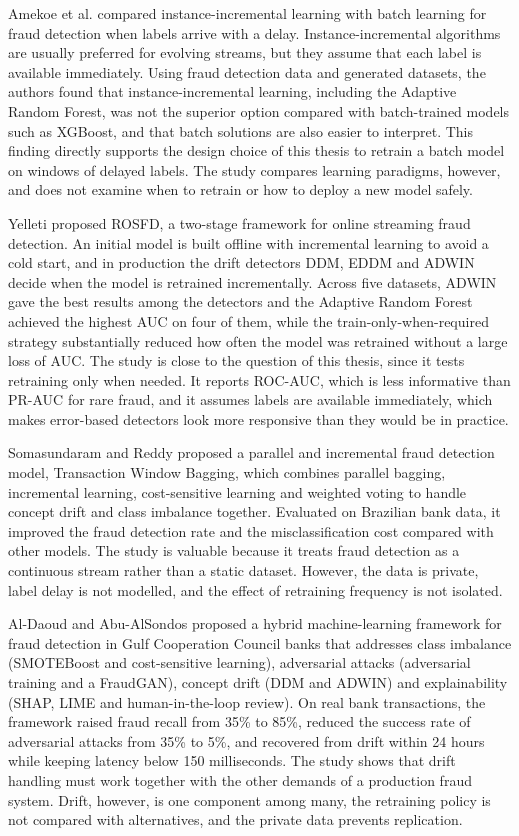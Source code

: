 Amekoe et al. \cite{amekoe2024} compared instance-incremental learning with batch learning for fraud detection when labels arrive with a delay. Instance-incremental algorithms are usually preferred for evolving streams, but they assume that each label is available immediately. Using fraud detection data and generated datasets, the authors found that instance-incremental learning, including the Adaptive Random Forest, was not the superior option compared with batch-trained models such as XGBoost, and that batch solutions are also easier to interpret. This finding directly supports the design choice of this thesis to retrain a batch model on windows of delayed labels. The study compares learning paradigms, however, and does not examine when to retrain or how to deploy a new model safely.

Yelleti \cite{yelleti2025} proposed ROSFD, a two-stage framework for online streaming fraud detection. An initial model is built offline with incremental learning to avoid a cold start, and in production the drift detectors DDM, EDDM and ADWIN decide when the model is retrained incrementally. Across five datasets, ADWIN gave the best results among the detectors and the Adaptive Random Forest achieved the highest AUC on four of them, while the train-only-when-required strategy substantially reduced how often the model was retrained without a large loss of AUC. The study is close to the question of this thesis, since it tests retraining only when needed. It reports ROC-AUC, which is less informative than PR-AUC for rare fraud, and it assumes labels are available immediately, which makes error-based detectors look more responsive than they would be in practice.

Somasundaram and Reddy \cite{somasundaram2019} proposed a parallel and incremental fraud detection model, Transaction Window Bagging, which combines parallel bagging, incremental learning, cost-sensitive learning and weighted voting to handle concept drift and class imbalance together. Evaluated on Brazilian bank data, it improved the fraud detection rate and the misclassification cost compared with other models. The study is valuable because it treats fraud detection as a continuous stream rather than a static dataset. However, the data is private, label delay is not modelled, and the effect of retraining frequency is not isolated.

Al-Daoud and Abu-AlSondos \cite{aldaoud2025} proposed a hybrid machine-learning framework for fraud detection in Gulf Cooperation Council banks that addresses class imbalance (SMOTEBoost and cost-sensitive learning), adversarial attacks (adversarial training and a FraudGAN), concept drift (DDM and ADWIN) and explainability (SHAP, LIME and human-in-the-loop review). On real bank transactions, the framework raised fraud recall from 35\% to 85\%, reduced the success rate of adversarial attacks from 35\% to 5\%, and recovered from drift within 24 hours while keeping latency below 150 milliseconds. The study shows that drift handling must work together with the other demands of a production fraud system. Drift, however, is one component among many, the retraining policy is not compared with alternatives, and the private data prevents replication.

